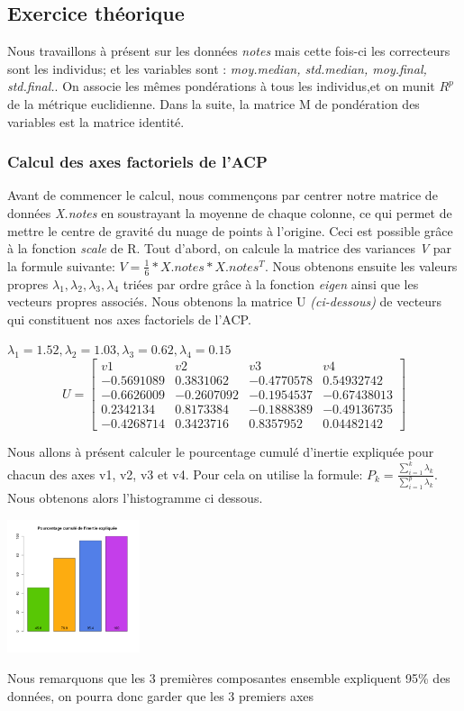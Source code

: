 \documentclass[10pt]{article}
\begin{document}
	\subsection{Exercice théorique}
	Nous travaillons à présent sur les données \textit{notes} mais cette fois-ci les correcteurs sont les individus; et les variables sont : \textit{moy.median, std.median, moy.final, std.final.}. On associe les mêmes pondérations à tous les individus,et on munit $R^{p}$ de la métrique euclidienne. Dans la suite, la matrice M de pondération des variables est la matrice identité.
	\subsubsection{Calcul des axes factoriels de l'ACP}
	Avant de commencer le calcul, nous commençons par centrer notre matrice de données \textit{X.notes} en soustrayant la moyenne de chaque colonne, ce qui permet de mettre le centre de gravité du nuage de points à l'origine. Ceci est possible grâce à la fonction \textit{scale} de R. Tout d'abord, on calcule la matrice des variances \textit{V} par la formule suivante: $V = \frac{1}{6}* X.notes* X.notes^{T}$. Nous obtenons ensuite les valeurs propres $\lambda_{1}, \lambda_{2}, \lambda_{3}, \lambda_{4}$ triées par ordre grâce à la fonction \textit{eigen} ainsi que les vecteurs propres associés. Nous obtenons la matrice U \textit{(ci-dessous)} de vecteurs qui constituent nos axes factoriels de l'ACP.
	
	\begin{center}
		$\lambda_{1}=	1.52 , \lambda_{2}= 1.03, \lambda_{3}= 0.62 , \lambda_{4}= 0.15$
		\[
		U=
		\begin{bmatrix}
		v1	& v2	& v3 &	v4\\
		-0.5691089	& 0.3831062	& -0.4770578 &	0.54932742\\
		-0.6626009	& -0.2607092 &	-0.1954537  &	-0.67438013\\
		0.2342134 & 	0.8173384	&  -0.1888389 & 	-0.49136735\\
		-0.4268714 &	0.3423716 &	0.8357952 &	0.04482142
		\end{bmatrix}
		\]
	\end{center}
	Nous allons à présent calculer le pourcentage cumulé d'inertie expliquée pour chacun des axes v1, v2, v3 et v4. Pour cela on utilise la formule: $P_{k}= \frac{\sum_{i=1}^{k} \lambda_{k}}{\sum_{i=1}^{p} \lambda_{k}}$. Nous obtenons alors l'histogramme ci dessous.
	\begin{center}
		\includegraphics[width=39mm]{Figures/Notes_PCA/pourcentage_inertie.png}
		\label{fig:boxplot_crabs_quantitatives}
	\end{center}	
Nous remarquons que les 3 premières composantes ensemble expliquent  95\%  des données, on pourra donc garder que les 3 premiers axes
	
\end{document}
